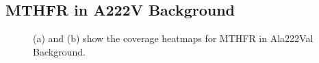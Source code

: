 \documentclass{article}
\begin{document}
\subsection{MTHFR in A222V Background}
\begin{figure}[H]%
    \centering
    \qquad
    \caption{(a) and (b) show the coverage heatmaps for MTHFR in Ala222Val Background.}%
    \label{fig:coverage MTHFR}%
\end{figure}
\end{document}
